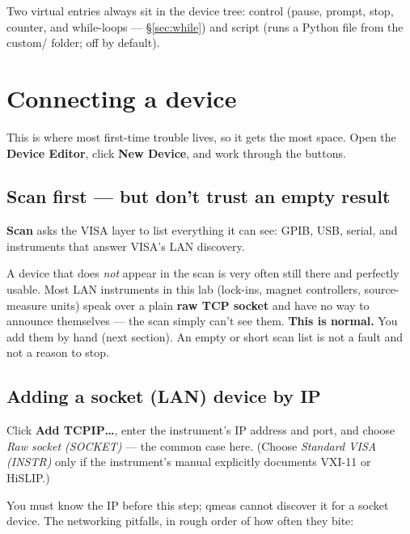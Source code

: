 \documentclass[11pt,a4paper]{article}
\newcommand{\code}[1]{{\ttfamily\color{qcode}#1}}
\begin{document}
Two virtual entries always sit in the device tree: \code{control} (pause,
prompt, stop, counter, and while-loops --- \S\ref{sec:while}) and \code{script} (runs a
Python file from the \code{custom/} folder; off by default).

\section{Connecting a device}

This is where most first-time trouble lives, so it gets the most space.
Open the \textbf{Device Editor}, click \textbf{New Device}, and work through
the buttons.

\subsection{Scan first --- but don't trust an empty result}

\textbf{Scan} asks the VISA layer to list everything it can see: GPIB, USB,
serial, and instruments that answer VISA's LAN discovery.

\begin{warn}
A device that does \emph{not} appear in the scan is very often still there
and perfectly usable. Most LAN instruments in this lab (lock-ins, magnet
controllers, source-measure units) speak over a plain \textbf{raw TCP
socket} and have no way to announce themselves --- the scan simply can't
see them. \textbf{This is normal.} You add them by hand (next section). An
empty or short scan list is not a fault and not a reason to stop.
\end{warn}

\subsection{Adding a socket (LAN) device by IP}\label{sec:connecting}

Click \textbf{Add TCPIP\ldots}, enter the instrument's IP address and port,
and choose \emph{Raw socket (SOCKET)} --- the common case here. (Choose
\emph{Standard VISA (INSTR)} only if the instrument's manual explicitly
documents VXI-11 or HiSLIP.)

You must know the IP before this step; qmeas cannot discover it for a
socket device. The networking pitfalls, in rough order of how often they
bite:
\end{document}
